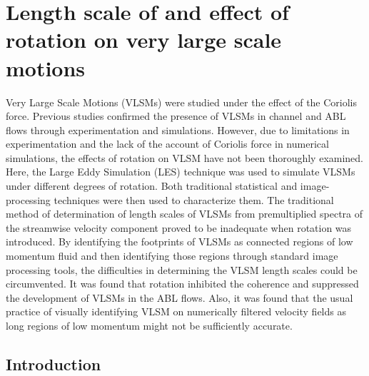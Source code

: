 
\chapter{Length scale of and effect of rotation on very large scale motions}\label{chap:chap1}
Very Large Scale Motions (VLSMs) were studied under  the effect of the Coriolis force. Previous studies confirmed the presence of VLSMs in channel and ABL flows through experimentation and simulations. However, due to limitations in experimentation and the lack of the account of Coriolis force in numerical simulations, the effects of rotation on VLSM have not been thoroughly examined.  Here, the Large Eddy Simulation (LES) technique was used to simulate VLSMs under different degrees of rotation.  Both traditional statistical and image-processing  techniques were then used to characterize them. The traditional method of determination of length scales of VLSMs from premultiplied spectra of the streamwise velocity component proved to be inadequate when rotation was introduced. By identifying the footprints of VLSMs as connected regions of low momentum fluid and then identifying those regions through standard image processing tools, the difficulties in determining  the VLSM length scales could be circumvented. It was found that rotation inhibited the coherence and suppressed the development of VLSMs in the ABL flows. Also, it was found that the usual practice of visually identifying  VLSM on numerically filtered velocity fields as long regions of low momentum might not be sufficiently accurate. 

\section{Introduction}
\label{intro} 

